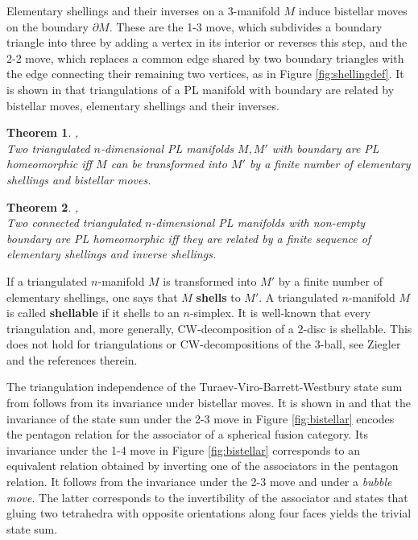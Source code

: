 \documentclass[1.5pt, a4paper]{article}
\newtheorem{theorem}{Theorem}[section]
\begin{document}
 
Elementary shellings and their inverses on a 3-manifold $M$ induce bistellar moves on the boundary $\partial M$. These are the 1-3 move, which subdivides a boundary triangle into three  by adding a vertex in its interior or reverses this step, and the 2-2 move, which replaces a common edge  shared by two boundary triangles with the edge connecting their remaining two vertices, as  in Figure \ref{fig:shellingdef}. It is shown  in \cite{Pshell, P} that  triangulations of a PL manifold with boundary are related by bistellar moves, elementary shellings and their inverses. 

\begin{theorem}\cite[Th.~4.14]{P}, \cite[Th.~2]{Pshell} \label{the:pachschellstell}\\
Two triangulated $n$-dimensional PL manifolds $M,M'$ with boundary are PL homeomorphic iff $M$ can be transformed into $M'$ by a finite number of elementary shellings and bistellar moves.
\end{theorem}

\begin{theorem}\cite[Th.~6.3]{P}, \cite[Th.~5.10]{L}\\  \label{th:pachshell}Two connected triangulated $n$-dimensional PL manifolds with non-empty boundary are PL homeomorphic iff they are related by a finite sequence of elementary shellings and  inverse shellings.
\end{theorem}




If a triangulated $n$-manifold $M$ is transformed  into  $M'$ by a finite number of elementary shellings, one says that $M$ {\bf shells} to $M'$. A triangulated $n$-manifold $M$ is called {\bf shellable} if it shells to an $n$-simplex. It is well-known that every triangulation and, more generally, CW-decomposition of a $2$-disc is shellable. 
This does not hold for  triangulations or CW-decompositions of the 3-ball, see Ziegler \cite{Zi} and the references therein.



The triangulation independence of the  Turaev-Viro-Barrett-Westbury  state sum  from \cite{TV,BW} follows from its invariance under bistellar moves.
It is shown in \cite{BW} and \cite{T} that the invariance of the state sum
 under the 2-3 move in Figure \ref{fig:bistellar} encodes the pentagon relation for the associator of a spherical fusion category. Its invariance under the 1-4 move in Figure \ref{fig:bistellar}  corresponds to an equivalent relation  obtained by inverting one of the associators in the pentagon relation.  It follows from the invariance under the 2-3 move and  under a \emph{bubble move}. The latter corresponds to the invertibility of the associator and  states that gluing two tetrahedra with  opposite orientations along  four faces yields the trivial state sum.  
 
\end{document}
